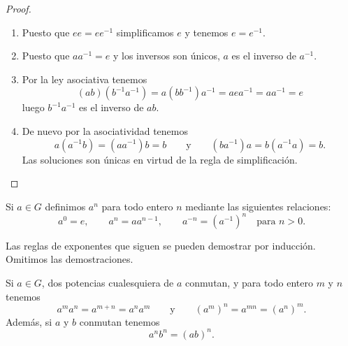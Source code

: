 \documentclass[12pt,a4paper]{book}
\begin{document}
    \begin{proof}
        \begin{enumerate}
            \item[(a)] Puesto que $ee=ee^{-1}$ simplificamos $e$ y tenemos $e=e^{-1}$.
            \item[(b)] Puesto que $aa^{-1}=e$ y los inversos son únicos, $a$ es el inverso
            de $a^{-1}$.
            \item[(c)] Por la ley asociativa tenemos
            \begin{equation*}
                (ab)(b^{-1}a^{-1})=a(bb^{-1})a^{-1}=aea^{-1}=aa^{-1}=e
            \end{equation*}
            luego $b^{-1}a^{-1}$ es el inverso de $ab$.
            \item[(d)] De nuevo por la asociatividad tenemos
            \begin{equation*}
                a(a^{-1}b)=(aa^{-1})b=b\qquad\text{y}\qquad(ba^{-1})a=b(a^{-1}a)=b.
            \end{equation*}
            Las soluciones son únicas en virtud de la regla de simplificación.
        \end{enumerate}
    \end{proof}

    \begin{definicion}
        Si $a\in G$ definimos $a^{n}$ para todo entero $n$ mediante las siguientes
        relaciones:
        \begin{equation*}
            a^{0}=e,\qquad a^{n}=aa^{n-1},\qquad a^{-n}=(a^{-1})^{n}\quad\text{para }n>0.
        \end{equation*}
    \end{definicion}

    Las reglas de exponentes que siguen se pueden demostrar por inducción. Omitimos las
    demostraciones.

    \begin{teorema}
        Si $a\in G$, dos potencias cualesquiera de $a$ conmutan, y para todo entero $m$ y
        $n$ tenemos
        \begin{equation*}
            a^{m}a^{n}=a^{m+n}=a^{n}a^{m}\qquad\text{y}\qquad(a^{m})^{n}=a^{mn}=(a^{n})^{m}.
        \end{equation*}
        Además, si $a$ y $b$ conmutan tenemos
        \begin{equation*}
            a^{n}b^{n}=(ab)^{n}.
        \end{equation*}
    \end{teorema}
\end{document}
